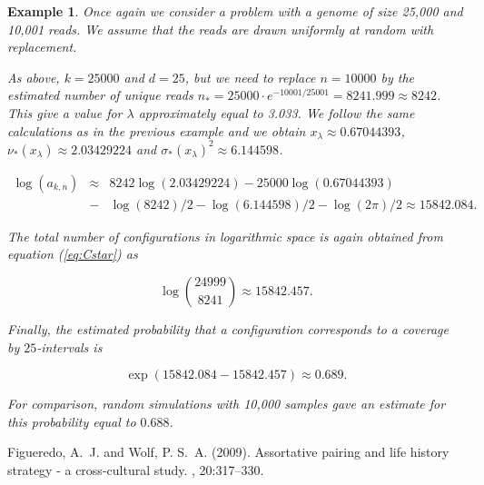 \documentclass{article}
\newtheorem{example}{Example}
\begin{document}
\begin{example}

Once again we consider a problem with a genome of size 25,000 and 10,001
reads. We assume that the reads are drawn uniformly at random with
replacement.

As above, $k=25000$ and $d=25$, but we need to replace $n=10000$ by the
estimated number of unique reads $n_* = 25000 \cdot e^{-10001/25001} =
8241.999 \approx 8242$. This give a value for $\lambda$ approximately
equal to 3.033. We follow the same calculations as in the previous example
and we obtain $x_\lambda \approx 0.67044393$, $\nu_*(x_\lambda) \approx
2.03429224$ and $\sigma_*(x_\lambda)^2 \approx 6.144598$.

\begin{eqnarray*}
\log(a_{k,n}) &\approx& 8242\log(2.03429224) - 25000\log(0.67044393) \\
&-& \log(8242)/2 - \log(6.144598)/2 - \log(2\pi)/2
\approx 15842.084.
\end{eqnarray*}

The total number of configurations in logarithmic space is again
obtained from equation (\ref{eq:Cstar}) as

\begin{equation*}
\log { 24999 \choose 8241 } \approx 15842.457.
\end{equation*}

Finally, the estimated probability that a configuration corresponds to a
coverage by $25$-intervals is

\begin{equation*}
\exp(15842.084-15842.457) \approx 0.689.
\end{equation*}

For comparison, random simulations with 10,000 samples gave an estimate
for this probability equal to $0.688$.

\end{example}


\begin{thebibliography}{99}

Figueredo, A.~J. and Wolf, P. S.~A. (2009).
\newblock Assortative pairing and life history strategy - a cross-cultural
  study.
, 20:317--330.
 
\end{thebibliography}

\end{document}
